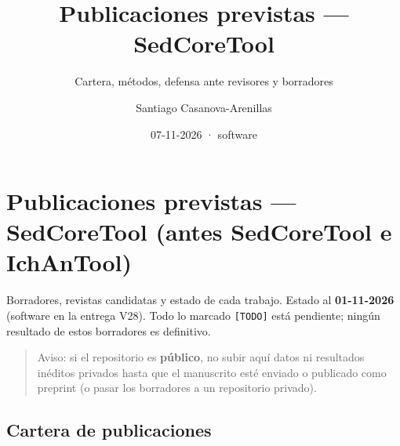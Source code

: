 \documentclass[
  10pt,
]{article}
\title{Publicaciones previstas --- SedCoreTool}
\subtitle{Cartera, métodos, defensa ante revisores y borradores}
\author{Santiago Casanova-Arenillas}
\date{07-11-2026 · software}
\begin{document}
\maketitle

{
\hypersetup{linkcolor=}
\setcounter{tocdepth}{2}
\tableofcontents
}
\hypertarget{publicaciones-previstas-sedcoretool-antes-sedcoretool-e-ichantool}{%
\section{Publicaciones previstas --- SedCoreTool (antes SedCoreTool e
IchAnTool)}\label{publicaciones-previstas-sedcoretool-antes-sedcoretool-e-ichantool}}

Borradores, revistas candidatas y estado de cada trabajo. Estado al
\textbf{01-11-2026} (software en la entrega V28). Todo lo marcado
\texttt{{[}TODO{]}} está pendiente; ningún resultado de estos borradores
es definitivo.

\begin{quote}
Aviso: si el repositorio es \textbf{público}, no subir aquí datos ni
resultados inéditos privados hasta que el manuscrito esté enviado o
publicado como preprint (o pasar los borradores a un repositorio
privado).
\end{quote}

\hypertarget{cartera-de-publicaciones}{%
\subsection{Cartera de publicaciones}\label{cartera-de-publicaciones}}
\end{document}
